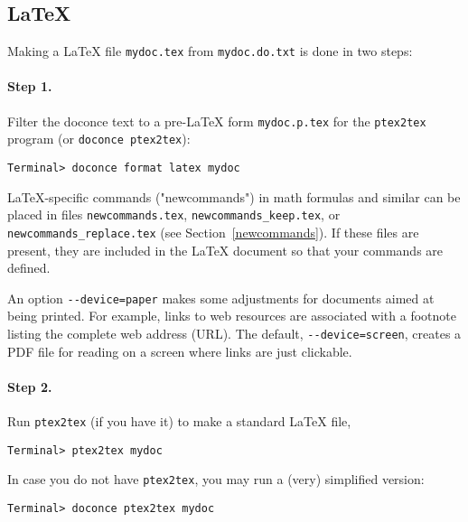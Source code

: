 \documentclass[%
oneside,                 %
final,                   %
10pt]{article}
\begin{document}
\subsection{{\LaTeX}}

Making a {\LaTeX} file {\fontsize{10pt}{10pt}\Verb!mydoc.tex!} from {\fontsize{10pt}{10pt}\Verb!mydoc.do.txt!} is done in two steps:

\paragraph{Step 1.}
Filter the doconce text to a pre-LaTeX form {\fontsize{10pt}{10pt}\Verb!mydoc.p.tex!} for
the {\fontsize{10pt}{10pt}\Verb!ptex2tex!} program (or {\fontsize{10pt}{10pt}\Verb!doconce ptex2tex!}):
\vspace{4pt}
\begin{Verbatim}[numbers=none,frame=lines,fontsize=\fontsize{9pt}{9pt},labelposition=topline,framesep=2.5mm,framerule=0.7pt]
Terminal> doconce format latex mydoc
\end{Verbatim}
LaTeX-specific commands ("newcommands") in math formulas and similar
can be placed in files {\fontsize{10pt}{10pt}\Verb!newcommands.tex!}, {\fontsize{10pt}{10pt}\Verb!newcommands_keep.tex!}, or
{\fontsize{10pt}{10pt}\Verb!newcommands_replace.tex!} (see Section~\ref{newcommands}).
If these files are present, they are included in the {\LaTeX} document
so that your commands are defined.

An option {\fontsize{10pt}{10pt}\Verb!--device=paper!} makes some adjustments for documents
aimed at being printed. For example, links to web resources are
associated with a footnote listing the complete web address (URL).
The default, {\fontsize{10pt}{10pt}\Verb!--device=screen!}, creates a PDF file for reading
on a screen where links are just clickable.

\paragraph{Step 2.}
Run {\fontsize{10pt}{10pt}\Verb!ptex2tex!} (if you have it) to make a standard {\LaTeX} file,
\vspace{4pt}
\begin{Verbatim}[numbers=none,frame=lines,fontsize=\fontsize{9pt}{9pt},labelposition=topline,framesep=2.5mm,framerule=0.7pt]
Terminal> ptex2tex mydoc
\end{Verbatim}
In case you do not have {\fontsize{10pt}{10pt}\Verb!ptex2tex!}, you may run a (very) simplified version:
\vspace{4pt}
\begin{Verbatim}[numbers=none,frame=lines,fontsize=\fontsize{9pt}{9pt},labelposition=topline,framesep=2.5mm,framerule=0.7pt]
Terminal> doconce ptex2tex mydoc
\end{Verbatim}
\end{document}
